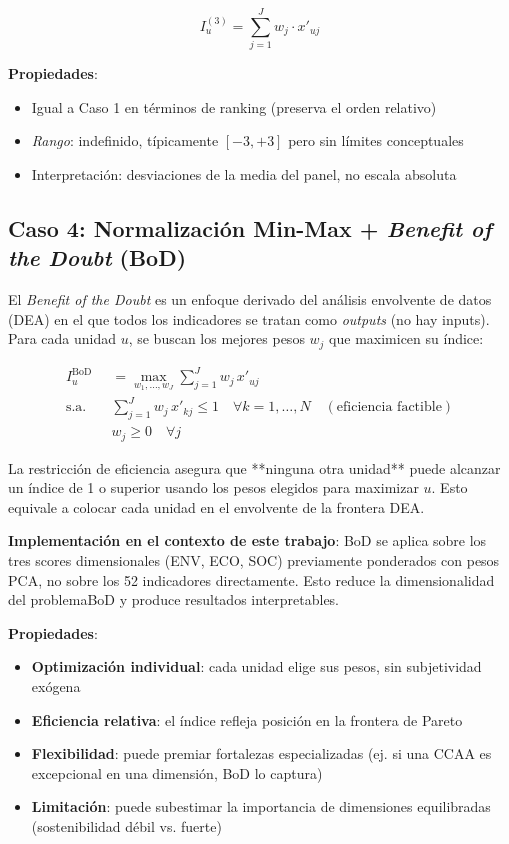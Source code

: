 \begin{equation}
    I_u^{(3)} = \sum_{j=1}^{J} w_j \cdot x'_{uj}
    \label{eq:case3}
\end{equation}

\textbf{Propiedades}:
\begin{itemize}
    \item Igual a Caso 1 en términos de ranking (preserva el orden relativo)
    \item \textit{Rango}: indefinido, típicamente $[-3, +3]$ pero sin límites conceptuales
    \item Interpretación: desviaciones de la media del panel, no escala absoluta
\end{itemize}

\subsection{Caso 4: Normalización Min-Max + \emph{Benefit of the Doubt} (BoD)}

El \emph{Benefit of the Doubt} es un enfoque derivado del análisis envolvente de datos (DEA) en el que todos los indicadores se tratan como \emph{outputs} (no hay inputs). Para cada unidad $u$, se buscan los mejores pesos $w_j$ que maximicen su índice:

\begin{equation}
    \begin{aligned}
        I_u^{\text{BoD}} &= \max_{w_1, \ldots, w_J} \sum_{j=1}^{J} w_j \, x'_{uj} \\
        \text{s.a.} \quad & \sum_{j=1}^{J} w_j \, x'_{kj} \leq 1 \quad \forall k = 1, \ldots, N \quad (\text{eficiencia factible}) \\
        & w_j \geq 0 \quad \forall j
    \end{aligned}
    \label{eq:bod}
\end{equation}

La restricción de eficiencia asegura que **ninguna otra unidad** puede alcanzar un índice de 1 o superior usando los pesos elegidos para maximizar $u$. Esto equivale a colocar cada unidad en el envolvente de la frontera DEA.

\textbf{Implementación en el contexto de este trabajo}: BoD se aplica sobre los tres scores dimensionales (ENV, ECO, SOC) previamente ponderados con pesos PCA, no sobre los 52 indicadores directamente. Esto reduce la dimensionalidad del problemaBoD y produce resultados interpretables.

\textbf{Propiedades}:
\begin{itemize}
    \item \textbf{Optimización individual}: cada unidad elige sus pesos, sin subjetividad exógena
    \item \textbf{Eficiencia relativa}: el índice refleja posición en la frontera de Pareto
    \item \textbf{Flexibilidad}: puede premiar fortalezas especializadas (ej. si una CCAA es excepcional en una dimensión, BoD lo captura)
    \item \textbf{Limitación}: puede subestimar la importancia de dimensiones equilibradas (sostenibilidad débil vs. fuerte)
\end{itemize}

